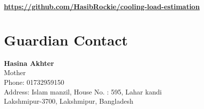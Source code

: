 \documentclass{article}
\begin{document}
      \textbf{\href{https://github.com/HasibRockie/cooling-load-estimation}{https://github.com/HasibRockie/cooling-load-estimation}}

      \vspace*{2cm}
      \section{Guardian Contact}
      \textbf{Hasina Akhter}\\
      Mother\\
      Phone: 01732959150 \\
      Address: Islam manzil, House No. : 595, Lahar kandi\\ Lakshmipur-3700, Lakshmipur, Bangladesh 
\end{document}
